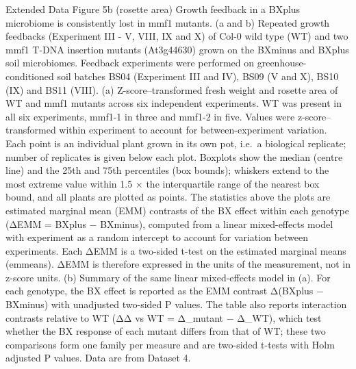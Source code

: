\documentclass[
  10pt,
]{article}
\begin{document}
Extended Data Figure 5b (rosette area) \textbar{} Growth feedback in a
BXplus microbiome is consistently lost in mmf1 mutants. (a and b)
Repeated growth feedbacks (Experiment III - V, VIII, IX and X) of Col-0
wild type (WT) and two mmf1 T-DNA insertion mutants (At3g44630) grown on
the BXminus and BXplus soil microbiomes. Feedback experiments were
performed on greenhouse-conditioned soil batches BS04 (Experiment III
and IV), BS09 (V and X), BS10 (IX) and BS11 (VIII). (a)
Z-score--transformed fresh weight and rosette area of WT and mmf1
mutants across six independent experiments. WT was present in all six
experiments, mmf1-1 in three and mmf1-2 in five. Values were
z-score--transformed within experiment to account for between-experiment
variation. Each point is an individual plant grown in its own pot,
i.e.~a biological replicate; number of replicates is given below each
plot. Boxplots show the median (centre line) and the 25th and 75th
percentiles (box bounds); whiskers extend to the most extreme value
within 1.5 × the interquartile range of the nearest box bound, and all
plants are plotted as points. The statistics above the plots are
estimated marginal mean (EMM) contrasts of the BX effect within each
genotype (ΔEMM = BXplus − BXminus), computed from a linear mixed-effects
model with experiment as a random intercept to account for variation
between experiments. Each ΔEMM is a two-sided t-test on the estimated
marginal means (emmeans). ΔEMM is therefore expressed in the units of
the measurement, not in z-score units. (b) Summary of the same linear
mixed-effects model in (a). For each genotype, the BX effect is reported
as the EMM contrast Δ(BXplus − BXminus) with unadjusted two-sided P
values. The table also reports interaction contrasts relative to WT (ΔΔ
vs WT = Δ\_mutant − Δ\_WT), which test whether the BX response of each
mutant differs from that of WT; these two comparisons form one family
per measure and are two-sided t-tests with Holm adjusted P values. Data
are from Dataset 4.
\end{document}
